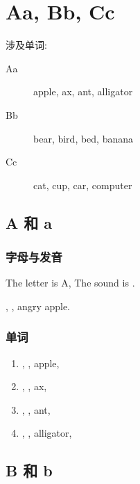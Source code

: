 \chapter{Aa, Bb, Cc}

\noindent 涉及单词:

\begin{description}
  \item[Aa] apple, ax, ant, alligator
  \item[Bb] bear, bird, bed, banana  
  \item[Cc] cat, cup, car, computer 
\end{description}

\section{A 和 a}

\subsection{字母与发音}

The letter is A, The sound is \jkipa{\ae}.

\jkipa{\ae}, \jkipa{\ae}, angry apple.


\subsection{单词}

\begin{enumerate}
  \item \jkipa{\ae}, \jkipa{\ae}, apple, 
  \item \jkipa{\ae}, \jkipa{\ae}, ax, 
  \item \jkipa{\ae}, \jkipa{\ae}, ant, 
  \item \jkipa{\ae}, \jkipa{\ae}, alligator, 
\end{enumerate}




\section{B 和 b}

